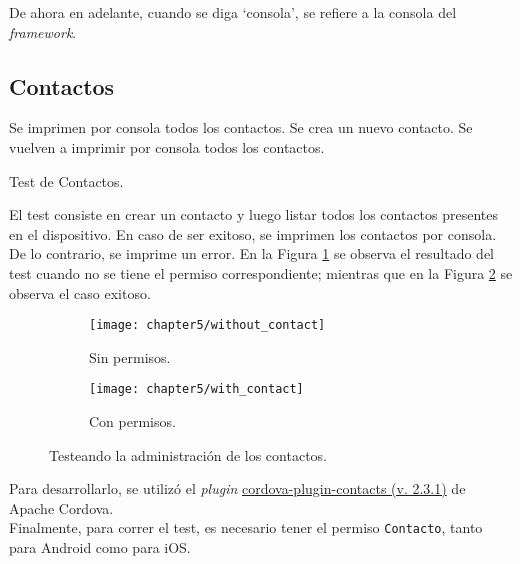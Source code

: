 De ahora en adelante, cuando se diga `consola', se refiere a la consola del \textit{framework}.
\subsection{Contactos}
\begin{algorithm}
	\begin{algorithmic}[1]
		\STATE Se imprimen por consola todos los contactos.
		\STATE Se crea un nuevo contacto.
		\STATE Se vuelven a imprimir por consola todos los contactos.
	\end{algorithmic}
	\caption{Test de Contactos.}\label{alg:chap5:test_contactos}
\end{algorithm}
El test consiste en crear un contacto y luego listar todos los contactos presentes en el dispositivo. En caso de ser exitoso, se imprimen los contactos por consola. De lo contrario, se imprime un error. En la Figura \ref{fig:ch05:without_contact} se observa el resultado del test cuando no se tiene el permiso correspondiente; mientras que en la Figura \ref{fig:ch05:with_contact} se observa el caso exitoso.\\
\begin{figure}[hbp]
    \centering
    \begin{subfigure}{0.28\linewidth}
        \texttt{[image: chapter5/without\_contact]}
        \caption{Sin permisos.}
        \label{fig:ch05:without_contact}
    \end{subfigure}
    \begin{subfigure}{0.28\linewidth}
        \texttt{[image: chapter5/with\_contact]}
        \caption{Con permisos.}
        \label{fig:ch05:with_contact}
    \end{subfigure}
    \caption{Testeando la administración de los contactos.}
	\label{fig:ch05:contacts-cases}
\end{figure}

Para desarrollarlo, se utilizó el \textit{plugin} \href{https://www.npmjs.com/package/cordova-plugin-contacts}{cordova-plugin-contacts (v. 2.3.1)} de Apache Cordova.\\

Finalmente, para correr el test, es necesario tener el permiso \texttt{Contacto}, tanto para Android como para iOS.
